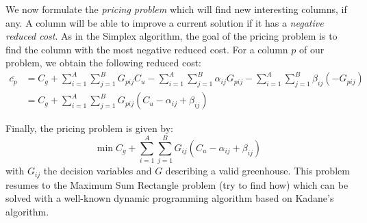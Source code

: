 We now formulate the \textit{pricing problem} which will find new interesting columns, if any.
A column will be able to improve a current solution if it has a \textit{negative reduced cost}.
As in the Simplex algorithm, the goal of the pricing problem is to find the column with the most negative reduced cost.
\bigbreak
\noindent{}
\bigbreak
For a column $p$ of our problem, we obtain the following reduced cost:
\begin{align}
    \overline{c_p} &= C_g + \sum_{i=1}^A \sum_{j=1}^B G_{pij} C_u - \sum_{i=1}^A \sum_{j=1}^B \alpha_{ij} G_{pij} - \sum_{i=1}^A \sum_{j=1}^B \beta_{ij} (- G_{pij}) \\
    &= C_g + \sum_{i=1}^A \sum_{j=1}^B G_{pij} \left( C_u - \alpha_{ij} + \beta_{ij} \right)
\end{align}

Finally, the pricing problem is given by:
\begin{equation}
    \min C_g + \sum_{i=1}^A \sum_{j=1}^B G_{ij} \left( C_u - \alpha_{ij} + \beta_{ij} \right)
\end{equation}
with $G_{ij}$ the decision variables and $G$ describing a valid greenhouse.
This problem resumes to the Maximum Sum Rectangle problem (try to find how)
which can be solved with a well-known dynamic programming algorithm based on Kadane's algorithm.
